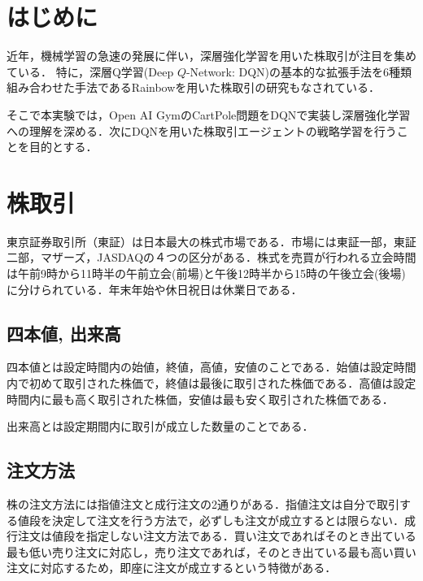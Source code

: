 \documentclass[twocolumn]{jarticle}
\begin{document}

\section{はじめに}
近年，機械学習の急速の発展に伴い，深層強化学習を用いた株取引が注目を集めている．
特に，深層Q学習(Deep $Q$-Network: DQN)の基本的な拡張手法を6種類組み合わせた手法であるRainbowを用いた株取引の研究\cite{d_mori}もなされている．

そこで本実験では，Open AI GymのCartPole問題をDQNで実装し深層強化学習への理解を深める．次にDQNを用いた株取引エージェントの戦略学習を行うことを目的とする．

\section{株取引}
    東京証券取引所（東証）は日本最大の株式市場である．市場には東証一部，東証二部，マザーズ，JASDAQの４つの区分がある．株式を売買が行われる立会時間は午前9時から11時半の午前立会(前場)と午後12時半から15時の午後立会(後場)に分けられている．年末年始や休日祝日は休業日である．
    \subsection{四本値, 出来高}

    四本値とは設定時間内の始値，終値，高値，安値のことである．始値は設定時間内で初めて取引された株価で，終値は最後に取引された株価である．高値は設定時間内に最も高く取引された株価，安値は最も安く取引された株価である．
    
    出来高とは設定期間内に取引が成立した数量のことである．
    \subsection{注文方法}
    株の注文方法には指値注文と成行注文の2通りがある．指値注文は自分で取引する値段を決定して注文を行う方法で，必ずしも注文が成立するとは限らない．成行注文は値段を指定しない注文方法である．買い注文であればそのとき出ている最も低い売り注文に対応し，売り注文であれば，そのとき出ている最も高い買い注文に対応するため，即座に注文が成立するという特徴がある．
    
\end{document}
